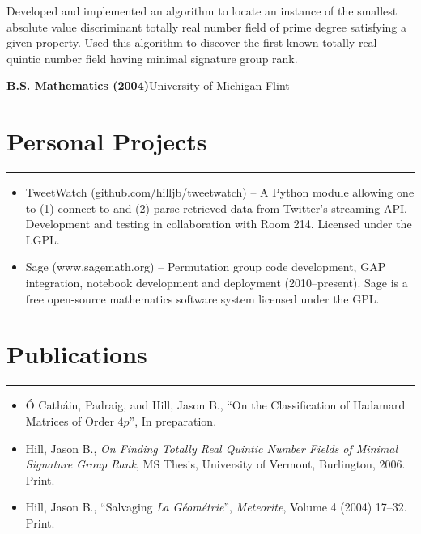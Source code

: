 \documentclass[letterpaper,10pt]{article}
\newcommand{\mblue}{\color{darkblue}}
\begin{document}
Developed and implemented an algorithm to locate an instance of the smallest absolute value
discriminant totally real number field of prime degree satisfying a given property. Used this
algorithm to discover the first known totally real quintic number field having minimal signature
group rank.

\bigbreak \textbf{B.S. Mathematics (2004)}\hfill University of Michigan-Flint


\section*{\mblue Personal Projects}

\vspace{-2.15pc}
{\hfill\mblue\rule{5.21in}{0.02cm}}

\vspace{1pc}
\begin{itemize}
\item TweetWatch (github.com/hilljb/tweetwatch) -- A Python module allowing one to (1) connect to
and (2) parse retrieved data from Twitter's streaming API. Development and testing in collaboration
with Room 214. Licensed under the LGPL.

\item Sage (www.sagemath.org) -- Permutation group code development, GAP integration, notebook
development and deployment (2010--present). Sage is a free open-source mathematics software system
licensed under the GPL.
\end{itemize}


\section*{\mblue Publications}

\vspace{-2.15pc}
{\hfill\mblue\rule{5.64in}{0.02cm}}

\vspace{1pc}
\begin{itemize}
\item \'O Cath\'ain, Padraig, and Hill, Jason B., ``On the Classification of Hadamard Matrices of Order
$4p$'', In preparation.
\item Hill, Jason B., \textit{On Finding Totally Real Quintic Number Fields of Minimal Signature
Group Rank}, MS Thesis, University of Vermont, Burlington, 2006. Print.
\item Hill, Jason B., ``Salvaging \textit{La G\'eom\'etrie}'', \textit{Meteorite}, Volume 4 (2004)
17--32. Print.
\end{itemize}
\end{document}
